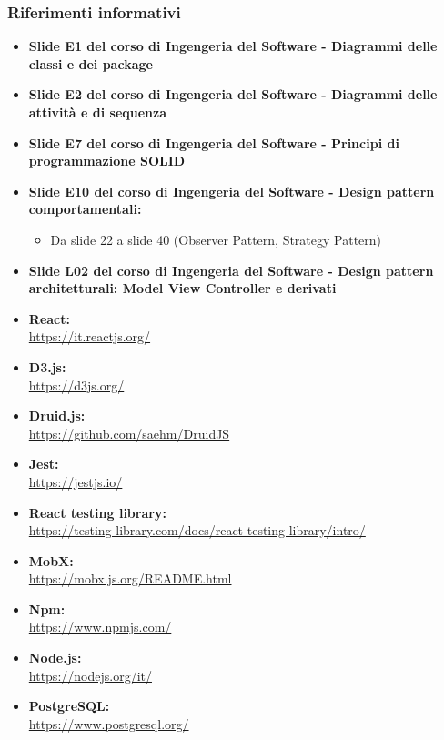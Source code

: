 \subsubsection{Riferimenti informativi} \label{riferimenti}
\begin{itemize}
	\item \textbf{Slide E1 del corso di Ingengeria del Software - Diagrammi delle classi e dei package}
	\item \textbf{Slide E2 del corso di Ingengeria del Software - Diagrammi delle attività e di sequenza}
	\item \textbf{Slide E7 del corso di Ingengeria del Software - Principi di programmazione SOLID}
	\item \textbf{Slide E10 del corso di Ingengeria del Software - Design pattern comportamentali:}
		\begin{itemize}
			\item Da slide 22 a slide 40 (Observer Pattern, Strategy Pattern)
		\end{itemize}
	\item \textbf{Slide L02 del corso di Ingengeria del Software - Design pattern architetturali: Model View Controller e derivati}
	\item \textbf{React:} \\
	\textcolor{blue}{\url{https://it.reactjs.org/}}
	\item \textbf{D3.js:}\\
	\textcolor{blue}{\url{https://d3js.org/}}
	\item \textbf{Druid.js:}\\
	\textcolor{blue}{\url{https://github.com/saehm/DruidJS}}
	\item \textbf{Jest:}\\
	\textcolor{blue}{\url{https://jestjs.io/}}
	\item \textbf{React testing library:}\\
	\textcolor{blue}{\url{https://testing-library.com/docs/react-testing-library/intro/}}
	\item \textbf{MobX:}\\
	\textcolor{blue}{\url{https://mobx.js.org/README.html}}
	\item \textbf{Npm:}\\
	\textcolor{blue}{\url{https://www.npmjs.com/}}
	\item \textbf{Node.js:}\\
	\textcolor{blue}{\url{https://nodejs.org/it/}}
	\item \textbf{PostgreSQL:}\\
	\textcolor{blue}{\url{https://www.postgresql.org/}}
\end{itemize}
	
